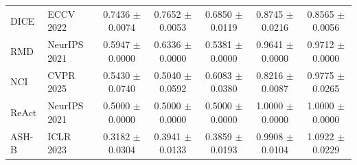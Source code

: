 \begin{table}[t]
{\begin{tabular}{llccccc}
DICE & ECCV 2022 & 0.7436 $\pm$ 0.0074 & 0.7652 $\pm$ 0.0053 & 0.6850 $\pm$ 0.0119 & 0.8745 $\pm$ 0.0216 & 0.8565 $\pm$ 0.0056 \\
RMD & NeurIPS 2021 & 0.5947 $\pm$ 0.0000 & 0.6336 $\pm$ 0.0000 & 0.5381 $\pm$ 0.0000 & 0.9641 $\pm$ 0.0000 & 0.9712 $\pm$ 0.0000 \\
NCI & CVPR 2025 & 0.5430 $\pm$ 0.0740 & 0.5040 $\pm$ 0.0592 & 0.6083 $\pm$ 0.0380 & 0.8216 $\pm$ 0.0087 & 0.9775 $\pm$ 0.0265 \\
ReAct & NeurIPS 2021 & 0.5000 $\pm$ 0.0000 & 0.5000 $\pm$ 0.0000 & 0.5000 $\pm$ 0.0000 & 1.0000 $\pm$ 0.0000 & 1.0000 $\pm$ 0.0000 \\
ASH-B & ICLR 2023 & 0.3182 $\pm$ 0.0304 & 0.3941 $\pm$ 0.0133 & 0.3859 $\pm$ 0.0193 & 0.9908 $\pm$ 0.0104 & 1.0922 $\pm$ 0.0229 \\
\bottomrule
\end{tabular}%
}
\end{table}

